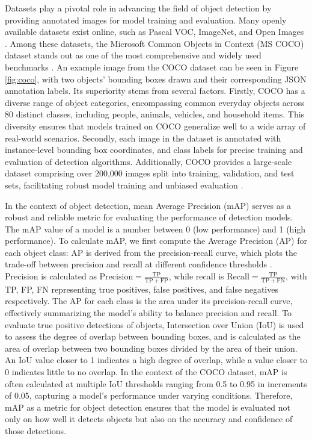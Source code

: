 \documentclass[journal,onecolumn,12pt]{IEEEtran}
\begin{document}
Datasets play a pivotal role in advancing the field of object detection by providing annotated images for model training and evaluation. Many openly available datasets exist online, such as Pascal VOC, ImageNet, and Open Images \cite{zaidi2021survey}. Among these datasets, the Microsoft Common Objects in Context (MS COCO) dataset stands out as one of the most comprehensive and widely used benchmarks \cite{lin2015microsoft}. An example image from the COCO dataset can be seen in Figure \ref{fig:coco}, with two objects' bounding boxes drawn and their corresponding JSON annotation labels. Its superiority stems from several factors. Firstly, COCO has a diverse range of object categories, encompassing common everyday objects across 80 distinct classes, including people, animals, vehicles, and household items. This diversity ensures that models trained on COCO generalize well to a wide array of real-world scenarios. Secondly, each image in the dataset is annotated with instance-level bounding box coordinates, and class labels for precise training and evaluation of detection algorithms. Additionally, COCO provides a large-scale dataset comprising over 200,000 images split into training, validation, and test sets, facilitating robust model training and unbiased evaluation \cite{lin2015microsoft}.

In the context of object detection, mean Average Precision (mAP) serves as a robust and reliable metric for evaluating the performance of detection models. The mAP value of a model is a number between 0 (low performance) and 1 (high performance). To calculate mAP, we first compute the Average Precision (AP) for each object class: AP is derived from the precision-recall curve, which plots the trade-off between precision and recall at different confidence thresholds \cite{map}. Precision is calculated as $\mathrm{Precision} = \frac{\mathrm{TP}}{\mathrm{TP} + \mathrm{FP}}$, while recall is $\mathrm{Recall} = \frac{\mathrm{TP}}{\mathrm{TP} + \mathrm{FN}}$, with TP, FP, FN representing true positives, false positives, and false negatives respectively. The AP for each class is the area under its precision-recall curve, effectively summarizing the model's ability to balance precision and recall. To evaluate true positive detections of objects, Intersection over Union (IoU) \cite{iou} is used to assess the degree of overlap between bounding boxes, and is calculated as the area of overlap between two bounding boxes divided by the area of their union. An IoU value closer to 1 indicates a high degree of overlap, while a value closer to 0 indicates little to no overlap. In the context of the COCO dataset, mAP is often calculated at multiple IoU thresholds ranging from 0.5 to 0.95 in increments of 0.05, capturing a model's performance under varying conditions. Therefore, mAP as a metric for object detection ensures that the model is evaluated not only on how well it detects objects but also on the accuracy and confidence of those detections.
\end{document}
